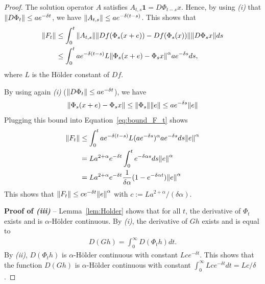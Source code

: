\documentclass[acmlarge]{acmart}
\newcommand\norm[1]{{\mathchoice{\bnorm{#1}}{\snorm{#1}}{\snorm{#1}}{\snorm{#1}}}}
\newcommand\bnorm[1]{\left\|#1\right\|}
\newcommand\snorm[1]{\|#1\|}
\begin{document}
\begin{proof}
  The solution operator $A$ satisfies
  $A_{t,s}\mathbf{1}=D\Phi_{t-s}x$. Hence, by using \emph{(i)} that
  $\norm{D\Phi_t}\le ae^{-\delta t}$, we have
  $\norm{A_{t,s}}\le ae^{-\delta (t-s)}$. This shows that
  \begin{align}
    \norm{F_t}&\le\int_0^t
                \norm{A_{t,s}}\norm{Df(\Phi_s(x+e))-Df(\Phi_s(x))}\norm{D\Phi_sx}ds
                \nonumber\\ 
              &\le \int_0^t ae^{-\delta (t-s)}
                L\norm{\Phi_s(x+e)-\Phi_sx}^\alpha a e^{-\delta s}ds,
                \label{eq:bound_F_t}
  \end{align}
  where $L$ is the Hölder constant of $Df$. 

  By using again \emph{(i)} ($\norm{D\Phi_t}\le ae^{-\delta t}$), we
  have
  \begin{align*}
    \norm{\Phi_s(x+e)-\Phi_sx} \le \norm{\Phi_s}\norm{e} \le
    ae^{-\delta s}\norm{e}
  \end{align*}
  Plugging this bound into Equation~\eqref{eq:bound_F_t} shows
  \begin{align*}
    \norm{F_t}&\le \int_0^t ae^{-\delta (t-s)}
                L(a e^{-\delta s})^\alpha  a e^{-\delta
                s}ds \norm{e}^\alpha \\
              &= L a^{2+\alpha} e^{-\delta t} \int_0^t
                e^{-\delta\alpha s}ds\norm{e}^\alpha\\
              & = L a^{2+\alpha} e^{-\delta t} \frac{1}{\delta \alpha}
                (1-e^{-\delta\alpha t})\norm{e}^\alpha
  \end{align*}
  This shows that $\norm{F_t}\le c e^{-\delta t}\norm{e}^\alpha$ with
  $c:=L a^{2+\alpha}/(\delta\alpha)$.


  \textbf{Proof of \emph{(iii)}} -- Lemma~\ref{lem:Holder} shows that
  for all $t$, the derivative of $\Phi_t$ exists and is
  $\alpha$-Hölder continuous. By \emph{(i)}, the derivative of $Gh$
  exists and is equal to 
  \begin{align*}
    D(Gh)= \int_0^\infty D(\Phi_th) dt. 
  \end{align*}
  By \emph{(ii)}, $D(\Phi_th)$ is $\alpha$-Hölder continuous with
  constant $Lce^{-\delta t}$. This shows that the function $D(Gh)$ is
  $\alpha$-Hölder continuous with constant
  $\int_0^\infty Lce^{-\delta t}dt = Lc/\delta$.
\end{proof}
\end{document}
